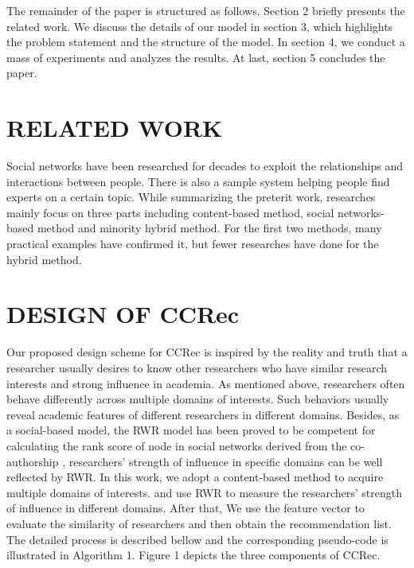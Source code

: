 \documentclass{acm_proc_article-sp}
\begin{document}
The remainder of the paper is structured as follows. Section 2 briefly presents the related work. We discuss the details of our model in section 3, which highlights the problem statement and the structure of the model. In section 4, we conduct a mass of experiments and analyzes the results. At last, section 5 concludes the paper.
\section{RELATED WORK}
Social networks have been researched for decades to exploit the relationships and interactions between people. There is also a sample system helping people find experts on a certain topic. While summarizing the preterit work, researches mainly focus on three parts including content-based method, social networks-based method and minority hybrid method. For the first two methods, many practical examples have confirmed it, but fewer researches have done for the hybrid method.

\section{DESIGN OF CCRec}
Our proposed design scheme for CCRec is inspired by the reality and truth that a researcher usually desires to know other researchers who have similar research interests and strong influence in academia. As mentioned above, researchers often behave differently across multiple domains of interests. Such behaviors usually reveal academic features of different researchers in different domains. Besides, as a social-based model, the RWR model has been proved to be competent for calculating the rank score of node in social networks derived from the co-authorship \cite{li2014acrec}, researchers' strength of influence in specific domains can be well reflected by RWR. In this work, we adopt a content-based method to acquire multiple domains of interests. and use RWR to measure the researchers' strength of influence in different domains. After that, We use the feature vector to evaluate the similarity of researchers and then obtain the recommendation list. The detailed process is described bellow and the corresponding pseudo-code is illustrated in Algorithm 1. Figure 1 depicts the three components of CCRec.
\end{document}
